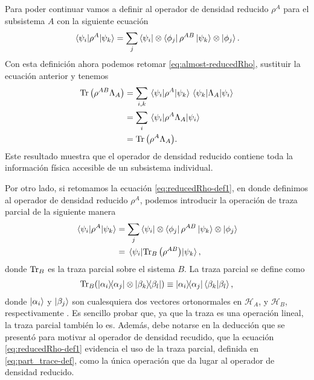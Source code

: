 Para poder continuar vamos a definir al operador de densidad
reducido $\rho^A$ para el subsistema $A$ con la siguiente ecuación
\cite{chandra2013quantum}
\begin{align}
	\matrixel{\psi_i}{\rho^A}{\psi_k} = 
	\sum _j \bra{\psi_i}\ten\bra{\phi_j}\rho^{AB}\ket{\psi_k}\ten\ket{\phi_j}.
	\label{eq:reducedRho-def1}
\end{align}
Con esta definición ahora podemos retomar  \eqref{eq:almost-reducedRho},
sustituir la ecuación anterior y tenemos
\begin{align}
	\Tr \qty(\rho^{AB}\Lambda_A)&= \sum _{i,k}
	\matrixel{\psi_i}{\rho^A}{\psi_k} \matrixel{\psi_k}{\Lambda_A}{\psi_i}\\
	&= \sum_i \matrixel{\psi_i}{\rho^A\Lambda_A}{\psi_i}\\
	&= \Tr \qty(\rho^A\Lambda_A). \label{eq:reduced-works}
\end{align}
Este resultado muestra que el operador de densidad reducido 
contiene toda la información física accesible de un subsistema individual.

Por otro lado, si retomamos la ecuación \eqref{eq:reducedRho-def1},
en donde definimos al operador de densidad reducido $\rho^A$, podemos
introducir la operación de traza parcial de la siguiente manera
\begin{align}
	\matrixel{\psi_i}{\rho^A}{\psi_k} &= 
	\sum _j \bra{\psi_i}\ten\bra{\phi_j}\rho^{AB}\ket{\psi_k}\ten\ket{\phi_j}\\
	&=\matrixel{\psi_i}{\Tr_B\qty(\rho^{AB})}{\psi_k},
	\label{eq:partialTrace-def}
\end{align}
donde $\Tr_B$ es la traza parcial sobre el sistema $B$. La traza parcial
se define como \cite{nielsen_chuang_2011}
\begin{align}
	\Tr_B (\dyad{\alpha_i}{\alpha_j}\otimes \dyad{\beta_k}{\beta_l})
	\equiv
	\dyad{\alpha_i}{\alpha_j}\braket{\beta_k}{\beta_l},
	\label{eq:part_trace-def}
\end{align}
donde $\ket{\alpha_i}$ y $\ket{\beta_j}$ son cualesquiera dos vectores
ortonormales en
$\mathcal{H}_A$, y $\mathcal{H}_B$, respectivamente
. Es sencillo probar
que, ya que la traza es una operación lineal, la traza parcial también 
lo es. 
Además, debe notarse en la deducción que se presentó para motivar 
al operador de densidad recudido, 
que la ecuación \eqref{eq:reducedRho-def1} evidencia 
el uso de la traza parcial, definida en \eqref{eq:part_trace-def}, 
como la única operación que da lugar al operador de densidad reducido. 

